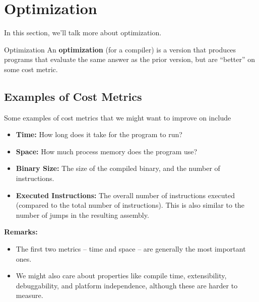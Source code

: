 \documentclass[letterpaper]{article}
\begin{document}
\section{Optimization}
In this section, we'll talk more about optimization. 

\begin{definition}{Optimization}{}
    An \textbf{optimization} (for a compiler) is a version that produces programs that evaluate the same answer as the prior version, but are ``better'' on some cost metric.
\end{definition}

\subsection{Examples of Cost Metrics}
Some examples of cost metrics that we might want to improve on include 
\begin{itemize}
    \item \textbf{Time:} How long does it take for the program to run? 
    \item \textbf{Space:} How much process memory does the program use? 
    \item \textbf{Binary Size:} The size of the compiled binary, and the number of instructions.
    \item \textbf{Executed Instructions:} The overall number of instructions executed (compared to the total number of instructions). This is also similar to the number of jumps in the resulting assembly.  
\end{itemize}
\textbf{Remarks:}
\begin{itemize}
    \item The first two metrics -- time and space -- are generally the most important ones. 
    \item We might also care about properties like compile time, extensibility, debuggability, and platform independence, although these are harder to measure.
\end{itemize}
\end{document}
